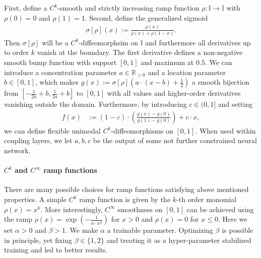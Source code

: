 \documentclass{article}
\begin{document}
First, define a $C^{k}$-smooth and strictly increasing ramp function $\rho \colon \mathbb{I} \rightarrow \mathbb{I}$ with $\rho(0)=0$ and $\rho(1)=1$. Second, define the generalized sigmoid 
\begin{align}
    \sigma[\rho](x) := \frac{\rho(x)}{\rho(x) + \rho(1 - x)}.
\end{align}
Then $\sigma[\rho]$ will be a $C^{k}$-diffeomorphsim on $\mathbb{I}$ and furthermore all derivatives up to order $k$ vanish at the boundary.
The first derivative defines a non-negative smooth bump function with
support $[0,1]$
and maximum at $0.5$.
We can introduce a concentration parameter $a \in \mathbb{R}_{>0}$  and a location parameter $b\in [0,1]$, which makes $g(x) := \sigma[\rho]\left(a \cdot (x - b) + \tfrac{1}{2}\right)$
a smooth bijection from $[-\frac{1}{2a} + b, \frac{1}{2a} + b]$ to $[0, 1]$ with all values and higher-order derivatives vanishing outside the domain.
Furthermore, by introducing $c \in (0, 1]$ and setting 
\begin{align}
    f(x) &:= (1 - c) \cdot \left( \frac{g(x) - g(0)}{g(1) - g(0)} \right) + c \cdot x \label{eq:bump-function-transformation},
\end{align}
we can define flexible unimodal $C^k$-diffeomorphisms on $[0,1]$. When used within coupling layers, we let $a, b, c$ be the output of some not further constrained neural network.


\paragraph{$C^{k}$ and $C^\infty$ ramp functions}
There are many possible choices for ramp functions satisfying above mentioned properties. A simple $C^{k}$ ramp function is given by the $k$-th order monomial $\rho(x) = x^{k}$. More interestingly, $C^{\infty}$ smoothness on $[0,1]$ can be achieved using the ramp $\rho(x) = \exp\left(-\frac{1}{\alpha\cdot x^\beta}\right)$ for $x > 0$ and $\rho(x) = 0$ for $x \leq 0$.
Here we set $\alpha > 0$ and $\beta > 1$. We make $\alpha$ a trainable parameter. Optimizing $\beta$ is possible in principle, yet fixing $\beta \in \{1, 2\}$ and treating it as a hyper-parameter stabilized training and led to better results.
\end{document}
